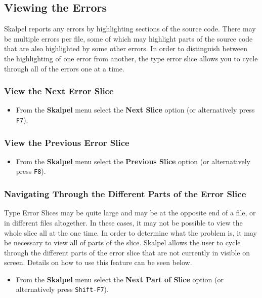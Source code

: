 \documentclass{report}
\begin{document}

\subsection{Viewing the Errors}

Skalpel reports any errors by highlighting sections of
the source code. There may be multiple errors per file, some of which
may highlight parts of the source code that are also highlighted by
some other errors. In order to distinguish between the highlighting
of one error from another, the type error slice allows you to cycle
through all of the errors one at a time.

\subsubsection{View the Next Error Slice}

\begin{itemize}
\item From the \textbf{Skalpel} menu select the \textbf{Next Slice}
  option (or alternatively press \texttt{F7}).
\end{itemize}

\subsubsection{View the Previous Error Slice}

\begin{itemize}
\item From the \textbf{Skalpel} menu select the \textbf{Previous Slice}
  option (or alternatively press \texttt{F8}).
\end{itemize}

\subsubsection{Navigating Through the Different Parts of the Error Slice}
Type Error Slices may be quite large and may be at the opposite end of
a file, or in different files altogether. In these cases, it may not
be possible to view the whole slice all at the one time. In order to
determine what the problem is, it may be necessary to view all of
parts of the slice. Skalpel allows the user to cycle
through the different parts of the error slice that are not currently
in visible on screen. Details on how to use this feature can be seen below.

\begin{itemize}
\item From the \textbf{Skalpel} menu select the \textbf{Next Part of
  Slice} option (or alternatively press \texttt{Shift-F7}).
\end{itemize}
\end{document}
